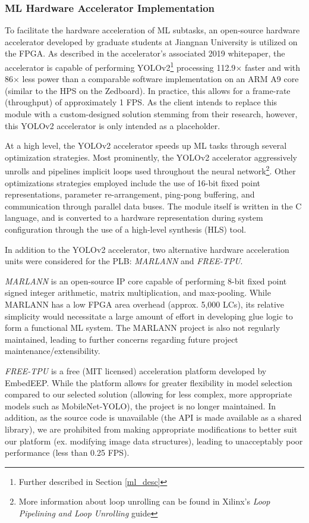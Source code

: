 \subsubsection{ML Hardware Accelerator Implementation}\label{ml_accel}
To facilitate the hardware acceleration of ML subtasks, an open-source hardware accelerator \cite{yolov2accel} developed by graduate students at Jiangnan University is utilized on the FPGA. As described in the accelerator's associated 2019 whitepaper\cite{yolov2unipaper}, the accelerator is capable of performing YOLOv2\footnote{Further described in Section \ref{ml_desc}} processing 112.9$\times$ faster and with 86$\times$ less power than a comparable software implementation on an ARM A9 core (similar to the HPS on the Zedboard). In practice, this allows for a frame-rate (throughput) of approximately 1 FPS. As the client intends to replace this module with a custom-designed solution stemming from their research, however, this YOLOv2 accelerator is only intended as a placeholder.

At a high level, the YOLOv2 accelerator speeds up ML tasks through several optimization strategies. Most prominently, the YOLOv2 accelerator aggressively unrolls and pipelines implicit loops used throughout the neural network\footnote{More information about loop unrolling can be found in Xilinx's \textit{Loop Pipelining and Loop Unrolling} guide\cite{xilinx}}. Other optimizations strategies employed include the use of 16-bit fixed point representations, parameter re-arrangement, ping-pong buffering\cite{pingpong}, and communication through parallel data buses. The module itself is written in the C language, and is converted to a hardware representation during system configuration through the use of a high-level synthesis (HLS) tool. 

In addition to the YOLOv2 accelerator, two alternative hardware acceleration units were considered for the PLB: \textit{MARLANN}\cite{marlann} and \textit{FREE-TPU}\cite{freetpu}. 

\textit{MARLANN} is an open-source IP core capable of performing 8-bit fixed point signed integer arithmetic, matrix multiplication, and max-pooling. While MARLANN has a low FPGA area overhead (approx. 5,000 LCs), its relative simplicity would necessitate a large amount of effort in developing glue logic to form a functional ML system. The MARLANN project is also not regularly maintained, leading to further concerns regarding future project maintenance/extensibility.

\textit{FREE-TPU} is a free (MIT licensed) acceleration platform developed by EmbedEEP. While the platform allows for greater flexibility in model selection compared to our selected solution (allowing for less complex, more appropriate models such as MobileNet-YOLO), the project is no longer maintained. In addition, as the source code is unavailable (the API is made available as a shared library), we are prohibited from making appropriate modifications to better suit our platform (ex. modifying image data structures), leading to unacceptably poor performance (less than 0.25 FPS).

